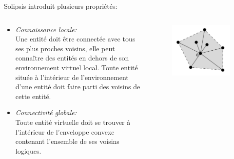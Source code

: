 \documentclass{beamer}
\begin{document}
  \begin{frame}
	Solipsis introduit plusieurs propriétés:
	 \begin{columns}
          \begin{column}{6cm}
	   \begin{itemize}
                \item \textit{Connaissance locale:}\\\tiny{
                Une entité doit être connectée avec tous ses plus proches voisins, elle peut connaître des entités en dehors de son environnement virtuel local. Toute entité située à l'intérieur de l'environnement d'une entité doit faire parti des voisins de cette entité.}
                \item \normalsize{\textit{Connectivité globale:}}\\\tiny{
                Toute entité virtuelle doit se trouver à l'intérieur de l'enveloppe convexe contenant l'ensemble de ses voisins logiques. \\}
	   \end{itemize}
	\end{column}
        \begin{column}{4cm}
        \begin{figure}
        \includegraphics[scale=0.3]{./Ressources/Images/envelop_convex3.png}\\

\end{figure}
\end{column}
\end{columns}
\end{frame}
\end{document}

